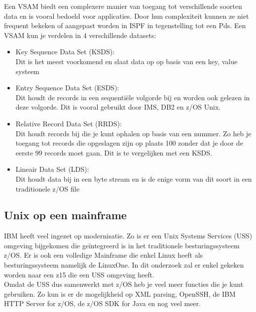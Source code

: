 Een VSAM biedt een complexere manier van toegang tot verschillende soorten data en is vooral bedoeld voor applicaties. Door hun complexiteit kunnen ze niet frequent bekeken of aangepast worden in ISPF in tegenstelling tot een Pds. Een VSAM kun je verdelen in 4 verschillende datasets:
\begin{itemize}
    \item Key Sequence Data Set (KSDS): \\Dit is het meest voorkomend en slaat data op op basis van een key, value systeem
    \item Entry Sequence Data Set (ESDS): \\Dit houdt de records in een sequentiële volgorde bij en worden ook gelezen in deze volgorde. Dit is vooral gebruikt door IMS, DB2 en z/OS Unix.
    \item Relative Record Data Set (RRDS): \\Dit houdt records bij die je kunt ophalen op basis van een nummer. Zo heb je toegang tot records die opgeslagen zijn op plaats 100 zonder dat je door de eerste 99 records moet gaan. Dit is te vergelijken met een KSDS.
    \item Lineair Data Set (LDS): \\Dit houdt data bij in een byte stream en is de enige vorm van dit soort in een traditionele z/OS file
\end{itemize}

\subsection{Unix op een mainframe}
IBM heeft veel ingezet op modernisatie. Zo is er een Unix Systems Services (USS) omgeving bijgekomen die geïntegreerd is in het traditionele besturingssysteem z/OS. Er is ook een volledige Mainframe die enkel Linux heeft als besturingssysteem namelijk de LinuxOne. In dit onderzoek zal er enkel gekeken worden naar een z15 die een USS omgeving heeft. \\

Omdat de USS dus samenwerkt met z/OS heb je veel meer functies die je kunt gebruiken. Zo kun is er de mogelijkheid op XML parsing, OpenSSH, de IBM HTTP Server for z/OS, de z/OS SDK for Java en nog veel meer. \autocite{Dhawan2013} \\
 
